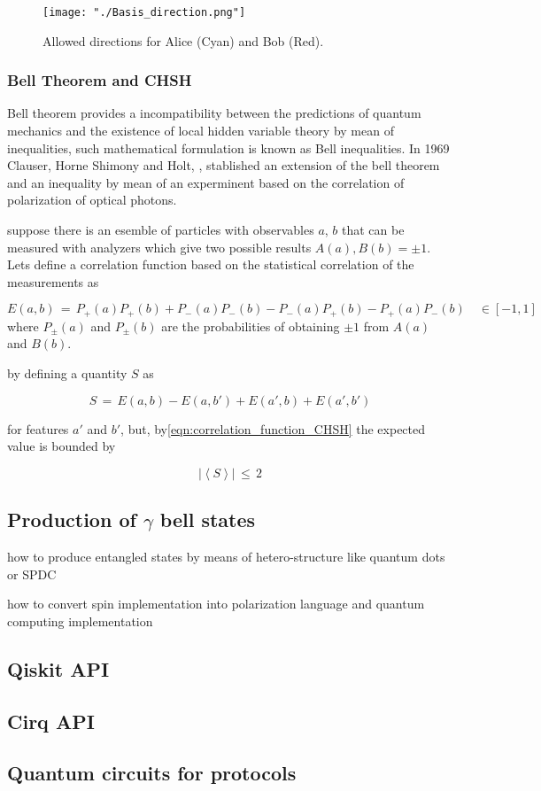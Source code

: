 \begin{figure}[H]
\centering
\texttt{[image: "./Basis\_direction.png"]}
\caption{Allowed directions for Alice (Cyan) and Bob (Red).}
\label{fig:directions_alice_bob_ekert}
\end{figure}

\subsubsection{Bell Theorem and CHSH}

Bell theorem \cite{bell1964einstein} provides a incompatibility between the predictions of quantum mechanics and the existence of local hidden variable theory by  mean of inequalities, such mathematical formulation is known as Bell inequalities. In 1969 Clauser, Horne Shimony and Holt, \cite{clauser1969proposed}, stablished an extension of the bell theorem and an inequality by mean of an experminent based on the correlation of polarization of optical photons.

suppose there is an esemble of particles with observables $a$, $b$ that can be measured with analyzers which give two possible results $A(a),B(b)=\pm 1$. Lets define a correlation function based on the statistical correlation of the measurements as 

\begin{equation}\label{eqn:correlation_function_CHSH}
E(a,b)\,=\,P_{+}(a)P_{+}(b) + P_{-}(a)P_{-}(b) - P_{-}(a)P_{+}(b) - P_{+}(a)P_{-}(b) \quad \in \left[-1,1\right]
\end{equation}
where $P_{\pm}(a)$ and $P_{\pm}(b)$ are the probabilities of obtaining $\pm1$ from $A(a)$ and $B(b)$.

by defining a quantity $S$ as

\begin{equation}\label{eqn:S_quantity_CHSH}
S\,=\,E(a,b) - E(a,b') + E(a',b) + E(a',b')
\end{equation}

for features $a'$ and $b'$, but, by\ref{eqn:correlation_function_CHSH} the expected value is bounded by 

\begin{equation}\label{eqn:CHSH_inequality}
\left\vert \left\langle S \right\rangle\right\vert\,\leq\,2
\end{equation}




\subsection{Production of $\gamma$ bell states}

how to produce entangled states by means of hetero-structure like quantum dots or SPDC

how to convert spin implementation into polarization language and quantum computing implementation

\subsection{Qiskit API}

\subsection{Cirq API}

\subsection{Quantum circuits for protocols}